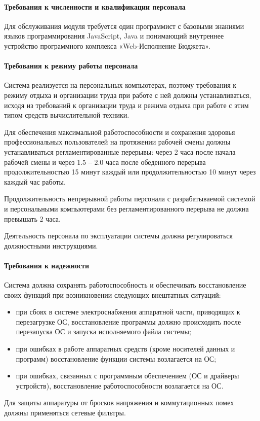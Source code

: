 \documentclass[a4paper]{extarticle}
\begin{document}
\paragraph{Требования к численности и квалификации персонала}
Для обслуживания модуля требуется один программист с базовыми знаниями языков программирования JavaScript, Java и понимающий внутреннее устройство программного комплекса «Web-Исполнение Бюджета».

\paragraph{Требования к режиму работы персонала}
Система реализуется на персональных компьютерах, поэтому требования к режиму отдыха и организации труда при работе с ней должны устанавливаться, исходя из требований к организации труда и режима отдыха при работе с этим типом средств вычислительной техники.\par
Для обеспечения максимальной работоспособности и сохранения здоровья профессиональных пользователей на протяжении рабочей смены должны устанавливаться регламентированные перерывы: через 2 часа после начала рабочей смены и через 1.5 – 2.0 часа после обеденного перерыва продолжительностью 15 минут каждый или продолжительностью 10 минут через каждый час работы.\par
Продолжительность непрерывной работы персонала с разрабатываемой системой и персональными компьютерами без регламентированного перерыва не должна превышать 2 часа.\par
Деятельность персонала по эксплуатации системы должна регулироваться должностными инструкциями.

\paragraph{Требования к надежности}
Система должна сохранять работоспособность и обеспечивать восстановление своих функций при возникновении следующих внештатных ситуаций:\par
\begin{itemize}
	\item при сбоях в системе электроснабжения аппаратной части, приводящих к перезагрузке ОС, восстановление программы должно происходить после перезапуска ОС и запуска исполняемого файла системы;
	\item при ошибках в работе аппаратных средств (кроме носителей данных и программ) восстановление функции системы возлагается на ОС;
	\item при ошибках, связанных с программным обеспечением (ОС и драйверы устройств), восстановление работоспособности возлагается на ОС.\par
\end{itemize}\par
Для защиты аппаратуры от бросков напряжения и коммутационных помех должны применяться сетевые фильтры.
\end{document}
